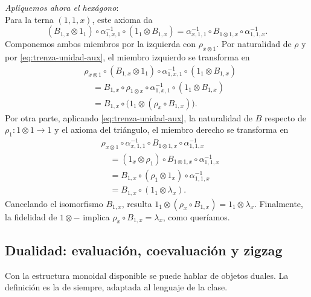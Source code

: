 \begin{sol}
\emph{Apliquemos ahora el hexágono}:\\
Para la terna $(1,1,x)$, este axioma da
\[
(B_{1,x}\otimes1_1)\circ\alpha^{-1}_{1,x,1}
\circ(1_1\otimes B_{1,x})
=
\alpha^{-1}_{x,1,1}\circ B_{1\otimes1,x}
\circ\alpha^{-1}_{1,1,x}.
\]
Componemos ambos miembros por la izquierda con $\rho_{x\otimes1}$. Por naturalidad de $\rho$ y por \eqref{eq:trenza-unidad-aux}, el miembro izquierdo se transforma en
\begin{align*}
&\rho_{x\otimes1}\circ(B_{1,x}\otimes1_1)
 \circ\alpha^{-1}_{1,x,1}\circ(1_1\otimes B_{1,x})\\
&\quad=B_{1,x}\circ\rho_{1\otimes x}
       \circ\alpha^{-1}_{1,x,1}\circ(1_1\otimes B_{1,x})\\
&\quad=B_{1,x}\circ
       \bigl(1_1\otimes(\rho_x\circ B_{1,x})\bigr).
\end{align*}
Por otra parte, aplicando \eqref{eq:trenza-unidad-aux}, la naturalidad de $B$ respecto de $\rho_1\colon1\otimes1\to1$ y el axioma del triángulo, el miembro derecho se transforma en
\begin{align*}
&\rho_{x\otimes1}\circ\alpha^{-1}_{x,1,1}
 \circ B_{1\otimes1,x}\circ\alpha^{-1}_{1,1,x}\\
&\quad=(1_x\otimes\rho_1)\circ B_{1\otimes1,x}
       \circ\alpha^{-1}_{1,1,x}\\
&\quad=B_{1,x}\circ(\rho_1\otimes1_x)
       \circ\alpha^{-1}_{1,1,x}\\
&\quad=B_{1,x}\circ(1_1\otimes\lambda_x).
\end{align*}
Cancelando el isomorfismo $B_{1,x}$, resulta
$1_1\otimes(\rho_x\circ B_{1,x})=1_1\otimes\lambda_x$.
Finalmente, la fidelidad de $1\otimes-$ implica
$\rho_x\circ B_{1,x}=\lambda_x$, como queríamos.
\end{sol}
\subsection{Dualidad: evaluación, coevaluación y zigzag}

Con la estructura monoidal disponible se puede hablar de objetos duales. La definición es la de siempre, adaptada al lenguaje de la clase.


